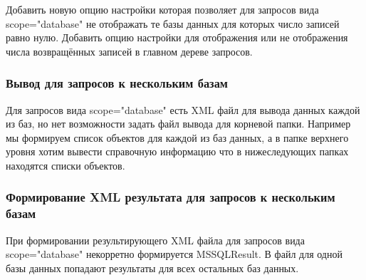 Добавить новую опцию настройки которая позволяет для запросов вида scope="database" не отображать те
базы данных для которых число записей равно нулю. Добавить опцию настройки для отображения или не
отображения числа возвращённых записей в главном дереве запросов.

\subsubsection{Вывод для запросов к нескольким базам}

Для запросов вида scope="database" есть XML файл для вывода данных каждой из баз, но нет возможности
задать файл вывода для корневой папки. Например мы формируем список объектов для каждой из баз
данных, а в папке верхнего уровня хотим вывести справочную информацию что в нижеследующих папках
находятся списки объектов.

\subsubsection{Формирование XML результата для запросов к нескольким базам}

При формировании результирующего XML файла для запросов вида scope="database" некорретно формируется
MSSQLResult. В файл для одной базы данных попадают результаты для всех остальных баз данных.

